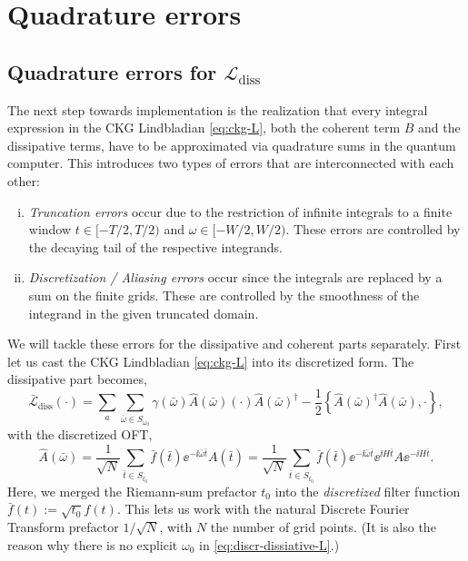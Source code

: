 \smallskip
\label{sec:ckg-quadrature}
\section{Quadrature errors}
\label{sec:quad-errors-diss}
\subsection{Quadrature errors for $\mathcal{L}_\text{diss}$}
The next step towards implementation is the realization that every integral expression in the CKG Lindbladian \eqref{eq:ckg-L}, both the coherent term $B$ and the dissipative terms, have to be approximated via quadrature sums in the quantum computer. This introduces two types of errors that are interconnected with each other:
\begin{enumerate}[(i)]
    \item \emph{Truncation errors} occur due to the restriction of infinite integrals to a finite window $t\in[-T/2, T/2)$ and $\omega \in [-W/2, W/2)$. These errors are controlled by the decaying tail of the respective integrands.
    \item \emph{Discretization / Aliasing errors} occur since the integrals are replaced by a sum on the finite grids. These are controlled by the smoothness of the integrand in the given truncated domain.
\end{enumerate}
We will tackle these errors for the dissipative and coherent parts separately. First let us cast the CKG Lindbladian \eqref{eq:ckg-L} into its discretized form. The dissipative part becomes,
\begin{equation} \label{eq:discr-dissiative-L}
    \mathcal{\bar{L}}_\text{diss}(\cdot) = \sum_a \sum_{\bar{\omega} \in S_{\omega_0}} \gamma(\bar{\omega}) \hat{A}(\bar{\omega})(\cdot)\hat{A}(\bar{\omega})^\dagger - \frac{1}{2}\left\{\hat{A}(\bar{\omega})^\dagger \hat{A}(\bar{\omega}), \cdot\right\},
\end{equation}
with the discretized OFT, 
\begin{equation} \label{eq:oft-discr}
    \hat{A}(\bar{\omega}) = \frac{1}{\sqrt{N}}\sum_{\bar{t}\in S_{t_0}} \bar{f}(\bar{t})\ee^{-\ii \bar{\omega} \bar{t}} A(\bar{t}) =  \frac{1}{\sqrt{N}}\sum_{\bar{t}\in S_{t_0}} \bar{f}(\bar{t})\ee^{-\ii \bar{\omega} \bar{t}} \ee^{\ii H \bar{t}} A \ee^{-\ii H \bar{t}}.
\end{equation}
Here, we merged the Riemann-sum prefactor $t_0$ into the \emph{discretized} filter function $\bar{f}(t) := \sqrt{t_0} f(t)$. This lets us work with the natural Discrete Fourier Transform prefactor $1 / \sqrt{N}$, with $N$ the number of grid points. (It is also the reason why there is no explicit $\omega_0$ in \eqref{eq:discr-dissiative-L}.)

